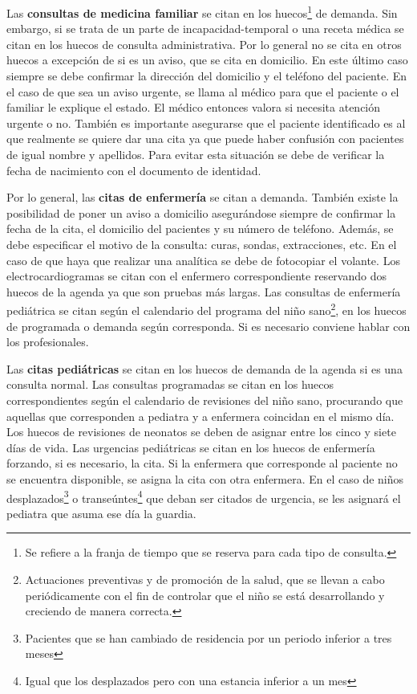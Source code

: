 Las \textbf{consultas de medicina familiar} se citan en los huecos\footnote{Se refiere a la franja de tiempo que se reserva para cada tipo de consulta.} de demanda.
Sin embargo, si se trata de un parte de \gls{incapacidad-temporal} o una receta médica se citan en los huecos de consulta administrativa.
Por lo general no se cita en otros huecos a excepción de si es un aviso, que se cita en domicilio.
En este último caso siempre se debe confirmar la dirección del domicilio y el teléfono del paciente.
En el caso de que sea un aviso urgente, se llama al médico para que el paciente o el familiar le explique el estado.
El médico entonces valora si necesita atención urgente o no.
También es importante asegurarse que el paciente identificado es al que realmente se quiere dar una cita ya que puede haber confusión con pacientes de igual nombre y apellidos.
Para evitar esta situación se debe de verificar la fecha de nacimiento con el documento de identidad.

Por lo general, las \textbf{citas de enfermería} se citan a demanda.
También existe la posibilidad de poner un aviso a domicilio asegurándose siempre de confirmar la fecha de la cita, el domicilio del pacientes y su número de teléfono.
Además, se debe especificar el motivo de la consulta: curas, sondas, extracciones, etc.
En el caso de que haya que realizar una analítica se debe de fotocopiar el \gls{volante}.
Los \glspl{electrocardiograma} se citan con el enfermero correspondiente reservando dos huecos de la agenda ya que son pruebas más largas.
Las consultas de enfermería pediátrica se citan según el calendario del programa del niño sano\footnote{Actuaciones preventivas y de promoción de la salud, que se llevan a cabo periódicamente con el fin de controlar que el niño se está desarrollando y creciendo de manera correcta.}, en los huecos de programada o demanda según corresponda. Si es necesario conviene hablar con los profesionales.

Las \textbf{citas pediátricas} se citan en los huecos de demanda de la agenda si es una consulta normal.
Las consultas programadas se citan en los huecos correspondientes según el calendario de revisiones del niño sano, procurando que aquellas que corresponden a pediatra y a enfermera coincidan en el mismo día.
Los huecos de revisiones de neonatos se deben de asignar entre los cinco y siete días de vida.
Las urgencias pediátricas se citan en los huecos de enfermería forzando, si es necesario, la cita.
Si la enfermera que corresponde al paciente no se encuentra disponible, se asigna la cita con otra enfermera.
En el caso de niños desplazados\footnote{Pacientes que se han cambiado de residencia por un periodo inferior a tres meses} o transeúntes\footnote{Igual que los desplazados pero con una estancia inferior a un mes} que deban ser citados de urgencia, se les asignará el pediatra que asuma ese día la \gls{guardia}.

